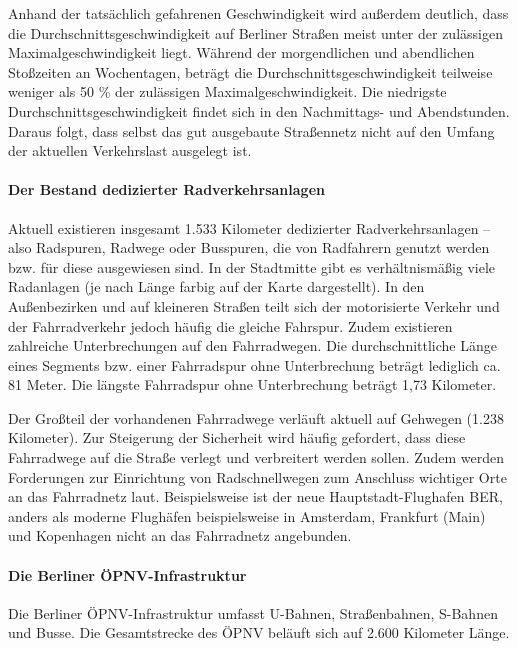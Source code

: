 Anhand der tatsächlich gefahrenen Geschwindigkeit wird außerdem deutlich, dass die Durchschnittsgeschwindigkeit auf Berliner Straßen meist unter der zulässigen Maximalgeschwindigkeit liegt. Während der morgendlichen und abendlichen Stoßzeiten an Wochentagen, beträgt die Durchschnittsgeschwindigkeit teilweise weniger als 50 \% der zulässigen Maximalgeschwindigkeit. Die niedrigste Durchschnittsgeschwindigkeit findet sich in den Nachmittags- und Abendstunden. Daraus folgt, dass selbst das gut ausgebaute Straßennetz nicht auf den Umfang der aktuellen Verkehrslast ausgelegt ist.


\paragraph{Der Bestand dedizierter Radverkehrsanlagen}

Aktuell existieren insgesamt 1.533 Kilometer dedizierter Radverkehrsanlagen – also Radspuren, Radwege oder Busspuren, die von Radfahrern genutzt werden bzw. für diese ausgewiesen sind. In der Stadtmitte gibt es verhältnismäßig viele Radanlagen (je nach Länge farbig auf der Karte dargestellt). In den Außenbezirken und auf kleineren Straßen teilt sich der motorisierte Verkehr und der Fahrradverkehr jedoch häufig die gleiche Fahrspur. Zudem existieren zahlreiche Unterbrechungen auf den Fahrradwegen. Die durchschnittliche Länge eines Segments bzw. einer Fahrradspur ohne Unterbrechung beträgt lediglich ca. 81 Meter. Die längste Fahrradspur ohne Unterbrechung beträgt 1,73 Kilometer.

Der Großteil der vorhandenen Fahrradwege verläuft aktuell auf Gehwegen (1.238 Kilometer). Zur Steigerung der Sicherheit wird häufig gefordert, dass diese Fahrradwege auf die Straße verlegt und verbreitert werden sollen. Zudem werden Forderungen zur Einrichtung von Radschnellwegen zum Anschluss wichtiger Orte an das Fahrradnetz laut. Beispielsweise ist der neue Hauptstadt-Flughafen BER, anders als moderne Flughäfen beispielsweise in Amsterdam, Frankfurt (Main) und Kopenhagen nicht an das Fahrradnetz angebunden.


\paragraph{Die Berliner ÖPNV-Infrastruktur}

Die Berliner ÖPNV-Infrastruktur umfasst U-Bahnen, Straßenbahnen, S-Bahnen und Busse. Die Gesamtstrecke des ÖPNV beläuft sich auf 2.600 Kilometer Länge.

